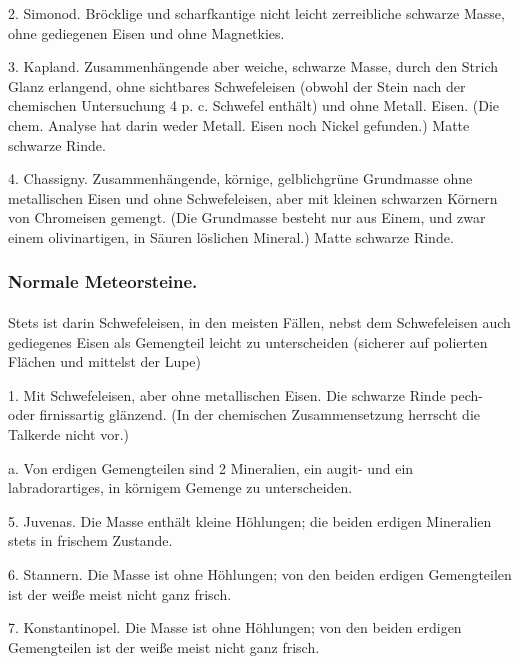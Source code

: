 \documentclass[a4paper, 11pt, oneside, polutonikogreek, german]{article}
\begin{document}
2. Simonod. Bröcklige und scharfkantige nicht leicht zerreibliche schwarze Masse, ohne gediegenen Eisen und ohne Magnetkies.

3. Kapland. Zusammenhängende aber weiche, schwarze Masse, durch den Strich Glanz erlangend, ohne sichtbares Schwefeleisen (obwohl der Stein nach der chemischen Untersuchung 4 p. c. Schwefel enthält) und ohne Metall. Eisen. (Die chem. Analyse hat darin weder Metall. Eisen noch Nickel gefunden.) Matte schwarze Rinde.

4. Chassigny. Zusammenhängende, körnige, gelblichgrüne Grundmasse ohne metallischen Eisen und ohne Schwefeleisen, aber mit kleinen schwarzen Körnern von Chromeisen gemengt. (Die Grundmasse besteht nur aus Einem, und zwar einem olivinartigen, in Säuren löslichen Mineral.) Matte schwarze Rinde.
\subsubsection{Normale Meteorsteine.}
\paragraph{}
Stets ist darin Schwefeleisen, in den meisten Fällen, nebst dem Schwefeleisen auch gediegenes Eisen als Gemengteil leicht zu unterscheiden (sicherer auf polierten Flächen und mittelst der Lupe)

\vspace{2ex}

1. Mit Schwefeleisen, aber ohne metallischen Eisen. Die schwarze Rinde pech- oder firnissartig glänzend. (In der chemischen Zusammensetzung herrscht die Talkerde nicht vor.)

\vspace{2ex}

\hspace*{10mm}a. Von erdigen Gemengteilen sind 2 Mineralien, ein augit- und ein labradorartiges, in körnigem Gemenge zu unterscheiden.

\hspace*{15mm}5. Juvenas. Die Masse enthält kleine Höhlungen; die beiden erdigen Mineralien stets in frischem Zustande.

\hspace*{15mm}6. Stannern. Die Masse ist ohne Höhlungen; von den beiden erdigen Gemengteilen ist der weiße meist nicht ganz frisch.

\hspace*{15mm}7. Konstantinopel. Die Masse ist ohne Höhlungen; von den beiden erdigen Gemengteilen ist der weiße meist nicht ganz frisch.
\end{document}
